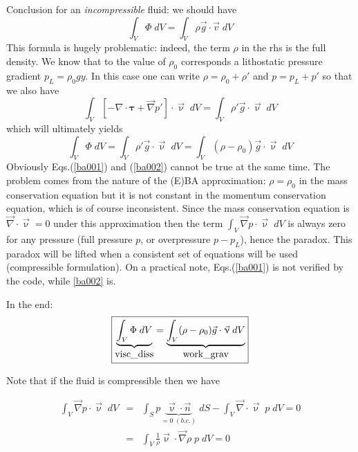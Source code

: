 \documentclass[a4paper,11pt]{article}
\newcommand{\nn}{\nonumber}
\begin{document}
Conclusion for an {\it incompressible} fluid: we should have
\begin{equation}
\int_V \Phi \;  dV 
=
\int_V \rho \vec{g} \cdot \vec{v} \;  dV 
\label{ba001}
\end{equation}
This formula is hugely problematic: indeed, the term $\rho$ in the rhs is the full density. We know 
that to the value of $\rho_0$ corresponds a lithostatic pressure gradient $p_L=\rho_0 g y$. In this case one can write $\rho = \rho_0 + \rho'$ and $p=p_L + p'$
so that we also have 
\[
\int_V  \left[ -\nabla \cdot {\bm \tau}  
+ \vec{\nabla} p' \right] \cdot \vec{\upnu} \; dV  
= \int_V  \rho' \vec{g} \cdot \vec{\upnu} \; dV
\]
which will ultimately yields 
\begin{equation}
\int_V \Phi \; dV 
= \int_V \rho' \vec{g} \cdot \vec{\upnu} \; dV 
= \int_V (\rho-\rho_0) \vec{g} \cdot \vec{\upnu} \; dV 
\label{ba002}
\end{equation}
Obviously Eqs.(\ref{ba001}) and (\ref{ba002}) cannot be true at the same time.
The problem comes from the nature of the (E)BA approximation: 
$\rho=\rho_0$ in the mass conservation equation
but it is not constant in the momentum conservation equation, which 
is of course inconsistent. Since the mass 
conservation equation is ${\vec\nabla}\cdot \vec{\upnu}=0$ under 
this approximation then the term 
$\int_V {\vec \nabla} p \cdot \vec{\upnu} \; dV$ is always zero for any 
pressure (full pressure $p$, or overpressure $p-p_L$), 
hence the paradox. This paradox will be lifted when a consistent set 
of equations will be used (compressible formulation).
On a practical note, Eqs.(\ref{ba001}) is not verified by the code, while \eqref{ba002} is.   

In the end:
\begin{equation}
\boxed{
\underbrace{\int_V \Phi \;  dV }_{\lstinline{visc_diss}}
=
\underbrace{\int_V (\rho-\rho_0) \vec{g} \cdot \vec{\upnu} \; dV }_{\lstinline{work_grav}}
}
\label{ba003}
\end{equation}


Note that if the fluid is compressible then we have 


\begin{eqnarray}
\int_V \vec{\nabla} p \cdot \vec{\upnu} \; dV  
&=& \int_S p \underbrace{ \vec{\upnu}\cdot \vec{n}}_{=0 \; (b.c.)} \; dS 
-\int_V \vec{\nabla} \cdot \vec{\upnu} \; p \; dV = 0  \nn\\
&=&  \int_V \frac{1}{\rho} \vec{\upnu} \cdot \vec{\nabla} \rho \; p \; dV = 0  
\end{eqnarray}
\end{document}
